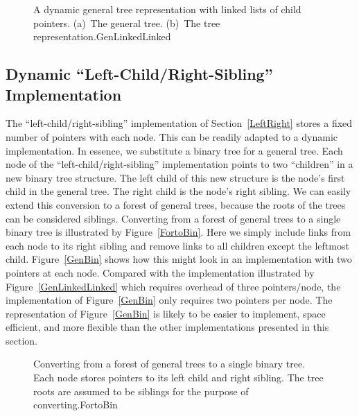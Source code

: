 \begin{figure}
\vspace{-\bigskipamount}\vspace{-\medskipamount}

{A dynamic general tree representation with linked lists of child
pointers.
(a)~The general tree.
(b)~The tree representation.}{GenLinkedLinked} 
\end{figure}

\newpage

\subsection{Dynamic ``Left-Child/Right-Sibling'' Implementation}
\label{DynamicLR}

The ``left-child/right-sibling'' implementation of
Section~\ref{LeftRight} stores a fixed number of pointers with each
node.
This can be readily adapted to a dynamic implementation.
In essence, we substitute a binary tree for a
general tree.
Each node of the ``left-child/right-sibling'' implementation points to
two ``children'' in a new binary tree structure.
The left child of this new structure is the node's first child
in the general tree.
The right child is the node's right sibling.
We can easily extend this conversion to a forest of general trees,
because the roots of the trees can be considered siblings.
Converting from a forest of general trees to a single binary tree is
illustrated by Figure~\ref{FortoBin}.
Here we simply include links from each node to its right sibling and
remove links to all children except the leftmost child.
Figure~\ref{GenBin} shows how this might look in an implementation
with two pointers at each node.
Compared with the implementation illustrated by
Figure~\ref{GenLinkedLinked} which requires overhead of three
pointers/node, the implementation of Figure~\ref{GenBin} only requires
two pointers per node.
The representation of Figure~\ref{GenBin} is likely to be easier
to implement, space efficient, and more flexible than the other
implementations presented in this section.
\begin{figure}
\vspace{-\bigskipamount}\vspace{-\smallskipamount}

{Converting from a forest of general trees to a single binary tree.
Each node stores pointers to its left child and right sibling.
The tree roots are assumed to be siblings for the purpose of
converting.}{FortoBin}
\medskip\smallskip
\end{figure}

